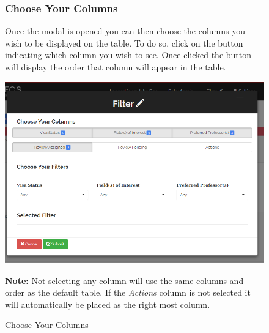 \documentclass[fontsize=12pt,paper=letter,twoside]{scrartcl}
\begin{document}
\begin{figure}[!htb]
\subsubsection{Choose Your Columns}
Once the modal is opened you can then choose the columns you wish to be displayed on the table. To do so, click on the button indicating which column you wish to see. Once clicked the button will display the order that column will appear in the table.

\begin{center}
\includegraphics[width=.99\textwidth]{images/mr/selected_col.png}
\end{center}
\caption{Choose Your Columns}
\label{fig:choose_columns}

\smallskip
\noindent \textbf{Note:} Not selecting any column will use the same columns and order as the default table. If the \emph{Actions} column is not selected it will automatically be placed as the right most column. 
\end{figure}
\end{document}
